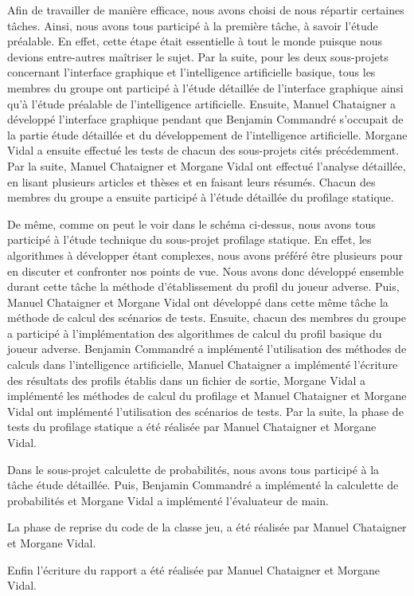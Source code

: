 \documentclass{report}
\begin{document}
\hspace{0.5cm}Afin de travailler de manière efficace, nous avons choisi de nous répartir certaines tâches. Ainsi, nous avons tous participé à la première tâche, à savoir l'étude préalable. En effet, cette étape était essentielle à tout le monde puisque nous devions entre-autres maîtriser le sujet. Par la suite, pour les deux sous-projets concernant l'interface graphique et l'intelligence artificielle basique, tous les membres du groupe ont participé à l'étude détaillée de l'interface graphique ainsi qu'à l'étude préalable de l'intelligence artificielle. Ensuite, Manuel Chataigner a développé l'interface graphique pendant que Benjamin Commandré s'occupait de la partie étude détaillée et du développement de l'intelligence artificielle. Morgane Vidal a ensuite effectué les tests de chacun des sous-projets cités précédemment. Par la suite, Manuel Chataigner et Morgane Vidal ont effectué l'analyse détaillée, en lisant plusieurs articles et thèses et en faisant leurs résumés. Chacun des membres du groupe a ensuite participé à l'étude détaillée du profilage statique. \par
De même, comme on peut le voir dans le schéma ci-dessus, nous avons tous participé à l'étude technique du sous-projet profilage statique. En effet, les algorithmes à développer étant complexes, nous avons préféré être plusieurs pour en discuter et confronter nos points de vue. Nous avons donc développé ensemble durant cette tâche la méthode d'établissement du profil du joueur adverse. Puis, Manuel Chataigner et Morgane Vidal ont développé dans cette même tâche la méthode de calcul des scénarios de tests. Ensuite, chacun des membres du groupe a participé à l'implémentation des algorithmes de calcul du profil basique du joueur adverse. Benjamin Commandré a implémenté l'utilisation des méthodes de calculs dans l'intelligence artificielle, Manuel Chataigner a implémenté l'écriture des résultats des profils établis dans un fichier de sortie, Morgane Vidal a implémenté les méthodes de calcul du profilage et Manuel Chataigner et Morgane Vidal ont implémenté l'utilisation des scénarios de tests.
Par la suite, la phase de tests du profilage statique a été réalisée par Manuel Chataigner et Morgane Vidal. \par
Dans le sous-projet calculette de probabilités, nous avons tous participé à la tâche étude détaillée. Puis, Benjamin Commandré a implémenté la calculette de probabilités et Morgane Vidal a implémenté l'évaluateur de main.\par
La phase de reprise du code de la classe jeu, a été réalisée par Manuel Chataigner et Morgane Vidal. \par
Enfin l'écriture du rapport a été réalisée par Manuel Chataigner et Morgane Vidal.\par
\end{document}
